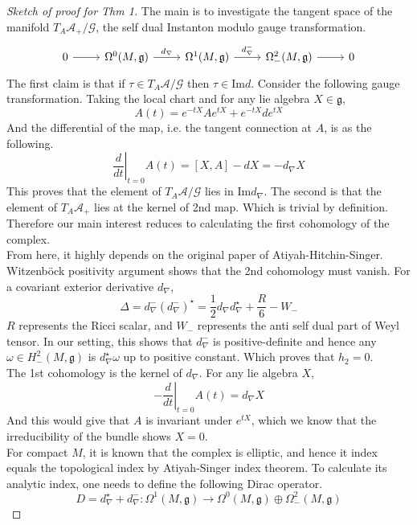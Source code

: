\documentclass{article}
\begin{document}
\begin{proof}[Sketch of proof for Thm 1]
    The main is to investigate the tangent space of the manifold $T_A \mathscr{A}_{+}/\mathscr{G}$, the self dual Instanton modulo gauge transformation.
    \[
    \begin{tikzcd}
        0 \arrow[r] & \Omega^0(M, \mathfrak{g}) \arrow[r, "d_\nabla"] & \Omega^1(M, \mathfrak{g}) \arrow[r,"d_\nabla^{-}"] & \Omega^2_{-}(M, \mathfrak{g}) \arrow[r] &  0
    \end{tikzcd}
    \]
    The first claim is that if $\tau \in T_A\mathscr{A}/\mathscr{G}$ then $\tau\in\mathrm{Im}d$. Consider the following gauge transformation. Taking the local chart and for any lie algebra $X\in\mathfrak{g}$, 
    \[
        A(t) = e^{-tX}A e^{tX} + e^{-tX}d e^{tX}
    \]
    And the differential of the map, i.e. the tangent connection at $A$, is as the following.
    \[
        \left.\frac{d}{dt}\right|_{t=0}A(t)= [X,A] - dX = -d_\nabla X
    \]
    This proves that the element of $T_A\mathscr{A}/\mathscr{G}$ lies in $\mathrm{Im}d_\nabla$. The second is that the element of $T_A\mathscr{A}_+$ lies at the kernel of 2nd map. Which is trivial by definition. Therefore our main interest reduces to calculating the first cohomology of the complex. \\
    From here, it highly depends on the original paper of Atiyah-Hitchin-Singer. Witzenböck positivity argument shows that the 2nd cohomology must vanish. 
        For a covariant exterior derivative $d_\nabla$, 
        \[
            \Delta= d_\nabla^{-} (d_\nabla^{-})^\star = \frac{1}{2}d_\nabla d_\nabla^\star + \frac{R}{6} - W_-
        \]
        $R$ represents the Ricci scalar, and $W_-$ represents the anti self dual part of Weyl tensor.
    In our setting, this shows that $d_\nabla^-$ is positive-definite and hence any $\omega\in H^2_-(M,\mathfrak{g})$ is $d_\nabla^\star\omega$ up to positive constant. Which proves that $h_2=0$.\\
    The 1st cohomology is the kernel of $d_\nabla$. For any lie algebra $X$,
    \[
        -\left.\frac{d}{dt}\right|_{t=0}A(t)= d_\nabla X
    \]
    And this would give that $A$ is invariant under $e^{tX}$, which we know that the irreducibility of the bundle shows $X=0$. 
    \\
    For compact $M$, it is known that the complex is elliptic, and hence it index equals the topological index by Atiyah-Singer index theorem. To calculate its analytic index, one needs to define the following Dirac operator.
    \[
       D = d_\nabla^{\star} + d_\nabla^{-}:\Omega^1(M,\mathfrak{g})\rightarrow \Omega^0(M,\mathfrak{g})\oplus\Omega^2_{-}(M,\mathfrak{g})
\]
\end{proof}
\end{document}

